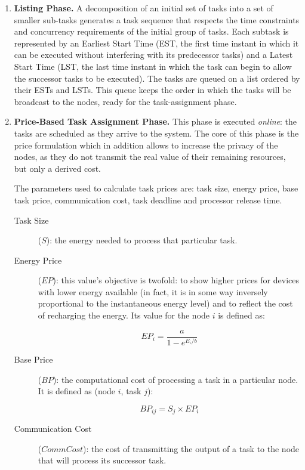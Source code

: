 \begin{enumerate}
\item \textbf{Listing Phase. } A decomposition of an initial set of tasks into a set of smaller sub-tasks generates a task sequence that respects the time constraints and concurrency requirements of the initial group of tasks. Each subtask is represented by an Earliest Start Time (EST, the first time instant in which it can be executed without interfering with its predecessor tasks) and a Latest Start Time (LST, the last time instant in which the task can begin to allow the successor tasks to be executed). The tasks are queued on a list ordered by their ESTs and LSTs. This queue keeps the order in which the tasks will be broadcast to the nodes, ready for the task-assignment phase.
\item \textbf{Price-Based Task Assignment Phase. } This phase is executed \emph{online}: the tasks are scheduled  as they arrive to the system. The core of this phase is the price formulation which in addition allows to increase the privacy of the nodes, as they do not transmit the real value of their remaining resources, but only a derived cost.

The parameters used to calculate task prices are: task size, energy price, base task price, communication cost, task deadline and processor release time.
\begin{description}
\item[Task Size] ($ S $): the energy needed to process that particular task.
\item[Energy Price] ($ EP $): this value's objective is twofold: to show higher prices for devices with lower energy available (in fact, it is in some way inversely proportional to the instantaneous energy level) and to reflect the cost of recharging the energy. Its value for the node $i$ is defined as:

\begin{equation}
EP_i = \frac{a}{1-e^{E_i/b}}
\end{equation}
 
\item[Base Price] ($ BP $): the computational cost of processing a task in a particular node. It is defined as (node $i$, task $j$):

\begin{equation}
BP_{ij} = S_j \times EP_i
\end{equation}

\item[Communication Cost] ($ CommCost $): the cost of transmitting the output of a task to the node that will process its successor task.


\end{description}
\end{enumerate}
